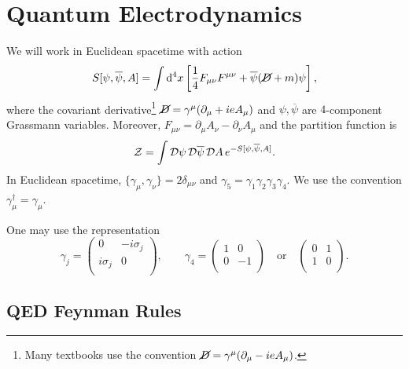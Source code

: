 \chapter{Quantum Electrodynamics}%
\label{cha:quantum_electrodynamics}

We will work in Euclidean spacetime with action
\begin{equation}
  S[\psi, \overline{\psi}{}, A] = \int \dd[4]{x} \left[ \frac{1}{4} F_{\mu\nu} F^{\mu\nu} + \overline{\psi}{}(\cancel{D} + m) \psi \right],
\end{equation}
where the covariant derivative\footnote{Many textbooks use the convention $\cancel{D} = \gamma^{\mu} ( \partial_{\mu} -i e A_{\mu})$.} $\cancel{D} = \gamma^{\mu} (\partial_{\mu} + i e A_{\mu})$ and $\psi, \overline{\psi}{}$ are $4$-component Grassmann variables. Moreover, $F_{\mu\nu} = \partial_{\mu} A_{\nu} - \partial_{\nu} A_{\mu}$ and the partition function is
\begin{equation}
  \mathcal{Z} = \int \mathop{\mathcal{D} \psi} \mathop{\mathcal{D} \overline{\psi}{}} \mathop{\mathcal{D} A} e^{-S[\psi, \overline{\psi}{}, A]}.
\end{equation}
In Euclidean spacetime, $\{\gamma_{\mu}, \gamma_{\nu}\} = 2 \delta_{\mu\nu}$ and $\gamma_5 = \gamma_1 \gamma_2 \gamma_3 \gamma_4$. We use the convention $\gamma_{\mu}^{\dagger} = \gamma_{\mu}$.
\begin{example}[]
  One may use the representation
  \begin{equation}
    \gamma_j = 
    \begin{pmatrix}
     0 & -i \sigma_j \\
     i \sigma_j & 0 \\
    \end{pmatrix}, \qquad 
    \gamma_4  =
    \begin{pmatrix}
     1 & 0 \\
     0 & -1 \\
    \end{pmatrix} \quad \text{or} \quad
    \begin{pmatrix}
     0 & 1 \\
     1 & 0 \\
    \end{pmatrix}.
  \end{equation}
\end{example}

\section{QED Feynman Rules}%
\label{sec:qed_feynman_rules}

